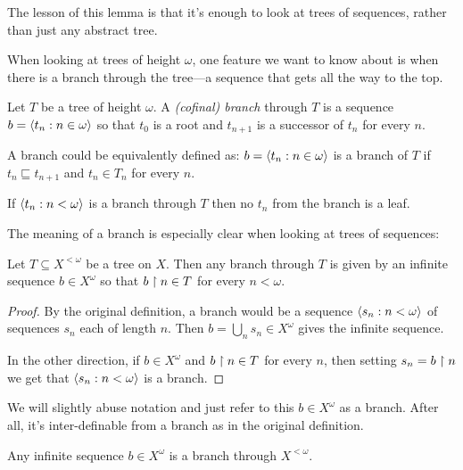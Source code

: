\documentclass[10pt]{amsart}
\begin{document}
The lesson of this lemma is that it's enough to look at trees of sequences, rather than just any abstract tree.

When looking at trees of height $\omega$, one feature we want to know about is when there is a branch through the tree---a sequence that gets all the way to the top.

\begin{definition}
Let $T$ be a tree of height $\omega$. A \emph{(cofinal) branch} through $T$ is a sequence $b = {\left\langle t_n : n \in \omega \right\rangle}$ so that $t_0$ is a root and $t_{n+1}$ is a successor of $t_n$ for every $n$.
\end{definition}

\begin{observation}
A branch could be equivalently defined as: $b = {\left\langle t_n : n \in \omega \right\rangle}$ is a branch of $T$ if $t_n \sqsubseteq t_{n+1}$ and $t_n \in T_n$ for every $n$.
\end{observation}

\begin{observation}
If ${\left\langle t_n : n < \omega \right\rangle}$ is a branch through $T$ then no $t_n$ from the branch is a leaf.
\end{observation}

The meaning of a branch is especially clear when looking at trees of sequences:

\begin{proposition}
Let $T \subseteq X^{<\omega}$ be a tree on $X$. Then any branch through $T$ is given by an infinite sequence $b \in X^\omega$ so that $b \upharpoonright n \in T$ for every $n < \omega$.
\end{proposition}

\begin{proof}
By the original definition, a branch would be a sequence ${\left\langle s_n : n < \omega \right\rangle}$ of sequences $s_n$ each of length $n$. Then $b = \bigcup_n s_n \in X^\omega$ gives the infinite sequence. 

In the other direction, if $b \in X^\omega$ and $b \upharpoonright n \in T$ for every $n$, then setting $s_n = b \upharpoonright n$ we get that ${\left\langle s_n : n < \omega \right\rangle}$ is a branch.
\end{proof}

We will slightly abuse notation and just refer to this $b \in X^{\omega}$ as a branch. After all, it's inter-definable from a branch as in the original definition. 

\begin{example}
Any infinite sequence $b \in X^{\omega}$ is a branch through $X^{<\omega}$.
\end{example}
\end{document}
